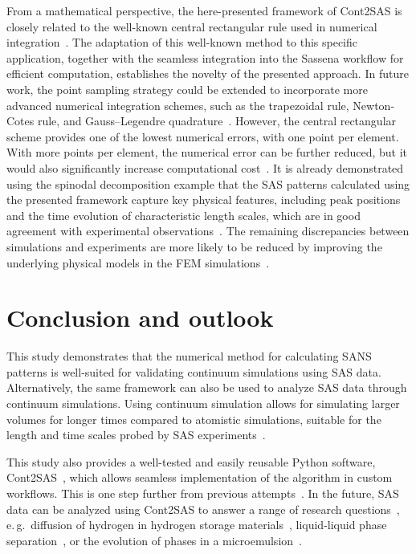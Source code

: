 \documentclass[preprint, 5p, times, twocolumn]{elsarticle}
\begin{document}
From a mathematical perspective, the here-presented framework of Cont2SAS is closely related to the well-known central rectangular rule used in numerical integration~\cite{stickler2016numerical}. The adaptation of this well-known method to this specific application, together with the seamless integration into the Sassena workflow for efficient computation, establishes the novelty of the presented approach. In future work, the point sampling strategy could be extended to incorporate more advanced numerical integration schemes, such as the trapezoidal rule, Newton-Cotes rule, and Gauss–Legendre quadrature~\cite{stickler2016numerical}. However, the central rectangular scheme provides one of the lowest numerical errors, with one point per element. With more points per element, the numerical error can be further reduced, but it would also significantly increase computational cost~\cite{majumdar2024computation}. It is already demonstrated using the  spinodal decomposition example that the SAS patterns calculated using the presented framework capture key physical features, including peak positions and the time evolution of characteristic length scales, which are in good agreement with experimental observations~\cite{hoernqvist2015early, furusaka1983spinodal}. The remaining discrepancies between simulations and experiments are more likely to be reduced by improving the underlying physical models in the FEM simulations~\cite{soriano2010effect, hedstrom2012phase, zhou2017effect}.

\section{Conclusion and outlook}

This study demonstrates that the numerical method for calculating SANS patterns is well-suited for validating continuum simulations using SAS data. Alternatively, the same framework can also be used to analyze SAS data through continuum simulations. Using continuum simulation allows for simulating larger volumes for longer times compared to atomistic simulations, suitable for the length and time scales probed by SAS experiments~\cite{hollamby2013practical}.

This study also provides a well-tested and easily reusable Python software, Cont2SAS~\cite{cont2sas}, which allows seamless implementation of the algorithm in custom workflows. This is one step further from previous attempts~\cite{schmidt2007simulation, dorrell2020combined}. In the future, SAS data can be analyzed using Cont2SAS to answer a range of research questions~\cite{majumdar2026investigation}, e.\,g.\ diffusion of hydrogen in hydrogen storage materials~\cite{aslan2019high}, liquid-liquid phase separation~\cite{girelli2021microscopic}, or the evolution of phases in a microemulsion~\cite{tabor2009time}.
\end{document}
